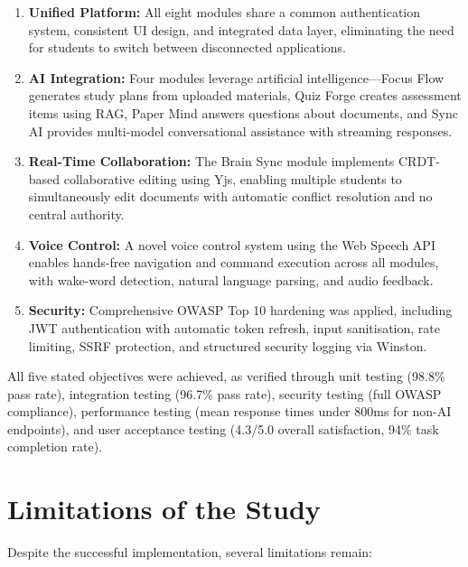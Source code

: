 \documentclass[12pt,a4paper]{report}
\begin{document}
\begin{enumerate}
    \item \textbf{Unified Platform:} All eight modules share a common authentication system, consistent UI design, and integrated data layer, eliminating the need for students to switch between disconnected applications.

    \item \textbf{AI Integration:} Four modules leverage artificial intelligence---Focus Flow generates study plans from uploaded materials, Quiz Forge creates assessment items using RAG, Paper Mind answers questions about documents, and Sync AI provides multi-model conversational assistance with streaming responses.

    \item \textbf{Real-Time Collaboration:} The Brain Sync module implements CRDT-based collaborative editing using Yjs, enabling multiple students to simultaneously edit documents with automatic conflict resolution and no central authority.

    \item \textbf{Voice Control:} A novel voice control system using the Web Speech API enables hands-free navigation and command execution across all modules, with wake-word detection, natural language parsing, and audio feedback.

    \item \textbf{Security:} Comprehensive OWASP Top 10 hardening was applied, including JWT authentication with automatic token refresh, input sanitisation, rate limiting, SSRF protection, and structured security logging via Winston.
\end{enumerate}

All five stated objectives were achieved, as verified through unit testing (98.8\% pass rate), integration testing (96.7\% pass rate), security testing (full OWASP compliance), performance testing (mean response times under 800ms for non-AI endpoints), and user acceptance testing (4.3/5.0 overall satisfaction, 94\% task completion rate).

\section{Limitations of the Study}

Despite the successful implementation, several limitations remain:
\end{document}
